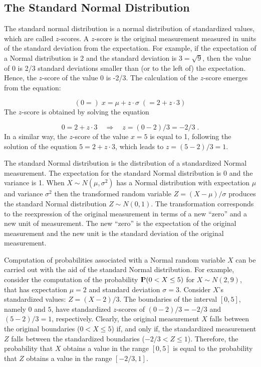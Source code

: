 \documentclass[]{krantz}
\newcommand{\Prob}{{\rm I\kern-.3em P}}
\theoremstyle{definition}
\theoremstyle{definition}
\theoremstyle{definition}
\theoremstyle{remark}
\begin{document}
\hypertarget{the-standard-normal-distribution}{%
\subsection{The Standard Normal Distribution}\label{the-standard-normal-distribution}}

The standard normal distribution is a normal distribution of
standardized values, which are called \(z\)-scores. A \(z\)-score is the
original measurement measured in units of the standard deviation from
the expectation. For example, if the expectation of a Normal
distribution is 2 and the standard deviation is \(3 = \sqrt{9}\), then the
value of 0 is 2/3 standard deviations smaller than (or to the left of)
the expectation. Hence, the \(z\)-score of the value 0 is -2/3. The
calculation of the \(z\)-score emerges from the equation:

\[(0 =)\; x = \mu + z \cdot \sigma\; (= 2 + z \cdot 3)\] The \(z\)-score
is obtained by solving the equation

\[0 = 2 + z \cdot 3 \quad \Longrightarrow \quad z = (0-2)/3 = -2/3\;.\]
In a similar way, the \(z\)-score of the value \(x = 5\) is equal to 1,
following the solution of the equation \(5 = 2 + z\cdot 3\), which leads
to \(z = (5-2)/3 = 1\).

The standard Normal distribution is the distribution of a standardized
Normal measurement. The expectation for the standard Normal distribution
is 0 and the variance is 1. When \(X \sim N(\mu,\sigma^2)\) has a Normal
distribution with expectation \(\mu\) and variance \(\sigma^2\) then the
transformed random variable \(Z = (X-\mu)/\sigma\) produces the standard
Normal distribution \(Z\sim N(0,1)\). The transformation corresponds to
the reexpression of the original measurement in terms of a new ``zero''
and a new unit of measurement. The new ``zero'' is the expectation of the
original measurement and the new unit is the standard deviation of the
original measurement.

Computation of probabilities associated with a Normal random variable
\(X\) can be carried out with the aid of the standard Normal distribution.
For example, consider the computation of the probability
\(\Prob(0 < X \leq 5)\) for \(X \sim N(2, 9)\), that has expectation \(\mu=2\)
and standard deviation \(\sigma = 3\). Consider \(X\)'s standardized values:
\(Z = (X-2)/3\). The boundaries of the interval \([0,5]\), namely \(0\) and
\(5\), have standardized \(z\)-scores of \((0-2)/3=-2/3\) and \((5-2)/3 =1\),
respectively. Clearly, the original measurement \(X\) falls between the
original boundaries (\(0 < X \leq 5\)) if, and only if, the standardized
measurement \(Z\) falls between the standardized boundaries
(\(-2/3 < Z \leq 1\)). Therefore, the probability that \(X\) obtains a value
in the range \([0,5]\) is equal to the probability that \(Z\) obtains a
value in the range \([-2/3,1]\).
\end{document}
